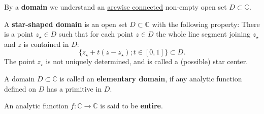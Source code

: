 \begin{definition}[Domain (II.2.3)]
    \label{sec:Domain}
    By a \textbf{domain} we understand an \hyperref[sec:ArcwiseConnected]{arcwise connected} non-empty open set $D \subset \mathbb{C}$.
\end{definition}


\begin{definition}
    \label{sec:StarDomain}
    A \textbf{star-shaped domain} is an open set $D \subset \mathbb{C}$ with the following property:
    There is a point $z_\star \in D$ such that for each point $z \in D$ the whole line segment joining $z_\star$ and $z$ is
    contained in $D$:
    $$\{ z_\star + t(z - z_\star) ; t \in [0, 1] \} \subset D .$$
    The point $z_\star$ is not uniquely determined, and is called a (possible) star center.
\end{definition}


\begin{definition}
    \label{sec:ElemDomain}
    A domain $D \subset \mathbb{C}$ is called an \textbf{elementary domain}, if
    any analytic function defined on $D$ has a primitive in $D$.
\end{definition}


\begin{definition}
    \label{sec:EntireFunction}
    An analytic function $f : \mathbb{C} \rightarrow \mathbb{C}$ is said to be \textbf{entire}.
\end{definition}